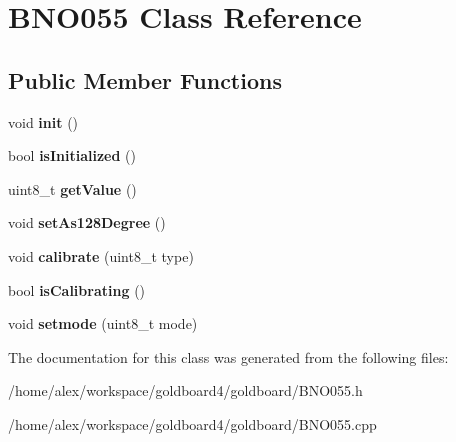 \hypertarget{class_b_n_o055}{}\section{B\+N\+O055 Class Reference}
\label{class_b_n_o055}
\subsection*{Public Member Functions}
\begin{DoxyCompactItemize}
\item 
void {\bfseries init} ()\hypertarget{class_b_n_o055_a3563c56aa744f459a93c808784cdc80f}{}\label{class_b_n_o055_a3563c56aa744f459a93c808784cdc80f}

\item 
bool {\bfseries is\+Initialized} ()\hypertarget{class_b_n_o055_ae8942ce1505fd4bf3c7a7e4cdacca711}{}\label{class_b_n_o055_ae8942ce1505fd4bf3c7a7e4cdacca711}

\item 
uint8\+\_\+t {\bfseries get\+Value} ()\hypertarget{class_b_n_o055_a4ef9484cfddf6cb511b3ffdc0299711b}{}\label{class_b_n_o055_a4ef9484cfddf6cb511b3ffdc0299711b}

\item 
void {\bfseries set\+As128\+Degree} ()\hypertarget{class_b_n_o055_a92dfe4b577241d213e2fab9208a8970e}{}\label{class_b_n_o055_a92dfe4b577241d213e2fab9208a8970e}

\item 
void {\bfseries calibrate} (uint8\+\_\+t type)\hypertarget{class_b_n_o055_a83e9dfa49008a13c9fecf5bceb291d7d}{}\label{class_b_n_o055_a83e9dfa49008a13c9fecf5bceb291d7d}

\item 
bool {\bfseries is\+Calibrating} ()\hypertarget{class_b_n_o055_ab435b1027af0ffd43013ba75a37055d2}{}\label{class_b_n_o055_ab435b1027af0ffd43013ba75a37055d2}

\item 
void {\bfseries setmode} (uint8\+\_\+t mode)\hypertarget{class_b_n_o055_ab9505b7796872c3811fa503390bcd0cd}{}\label{class_b_n_o055_ab9505b7796872c3811fa503390bcd0cd}

\end{DoxyCompactItemize}


The documentation for this class was generated from the following files\+:\begin{DoxyCompactItemize}
\item 
/home/alex/workspace/goldboard4/goldboard/B\+N\+O055.\+h\item 
/home/alex/workspace/goldboard4/goldboard/B\+N\+O055.\+cpp\end{DoxyCompactItemize}
